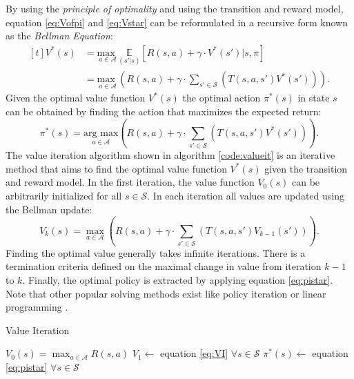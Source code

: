 By using the \textit{principle of optimality} \cite{dynprog} and using the transition and reward model, equation \ref{eq:Vofpi} and \ref{eq:Vstar} can be reformulated in a recursive form known as the \textit{Bellman Equation}:
%
\begin{equation}\label{eq:BE}
    \begin{aligned}[t]
    V^*(s) &= \underset{a\in\mathcal{A}}{\text{max }} \underset{(s'|s)}{\mathbb{E}}\left[R(s,a) + \gamma\cdot V^*(s')|s, \pi \right]\\
    &= \underset{a\in\mathcal{A}}{\text{max }} \left(R(s,a) + \gamma\cdot \sum_{s'\in\mathcal{S}}\left(T(s,a,s')V^*(s')\right)\right).
    \end{aligned}
\end{equation}
%
Given the optimal value function $V^*(s)$ the optimal action $\pi^*(s)$ in state $s$ can be obtained by finding the action that maximizes the expected return:
\begin{equation}\label{eq:pistar}
    \pi^*(s) = \underset{a\in\mathcal{A}}{\text{arg max}}\left(R(s,a) + \gamma\cdot \sum_{s'\in\mathcal{S}}\left(T(s,a,s')V^*(s')\right)\right).
\end{equation}
The value iteration algorithm shown in algorithm \ref{code:valueit} is an iterative method that aims to find the optimal value function $V^*(s)$ given the transition and reward model. In the first iteration, the value function $V_0(s)$ can be arbitrarily initialized for all $s\in\mathcal{S}$. In each iteration all values are updated using the Bellman update:
%
\begin{equation}\label{eq:VI}
    V_{k}(s) = \underset{a\in\mathcal{A}}{\max}  \left(R(s,a) + \gamma\cdot \sum_{s'\in\mathcal{S}}\left(T(s,a,s')V_{k-1}(s')\right)\right).
\end{equation}
%
Finding the optimal value generally takes infinite iterations. There is a termination criteria defined on the maximal change in value from iteration $k-1$ to $k$. Finally, the optimal policy is extracted by applying equation \ref{eq:pistar}. Note that other popular solving methods exist like policy iteration or linear programming \cite{dynprog}.
%
\begin{algorithm}[htb!]
    \DontPrintSemicolon
    \caption{Value Iteration}
    \label{code:valueit}
    \Output{$\pi^*$}
         $V_0(s) = \max_{a\in\mathcal{A}} R(s,a)$    
         $V_1 \leftarrow$ equation \ref{eq:VI} $\forall s\in\mathcal{S}$ 
        $\pi^*(s) \leftarrow$ equation \ref{eq:pistar} $\forall s\in\mathcal{S}$ 
\end{algorithm}
%

